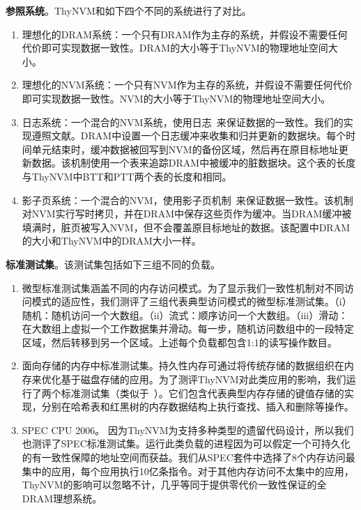 \textbf{参照系统}。ThyNVM和如下四个不同的系统进行了对比。
\begin{enumerate}
\item 理想化的DRAM系统：一个只有DRAM作为主存的系统，并假设不需要任何代价即可实现数据一致性。DRAM的大小等于ThyNVM的物理地址空间大小。 
\item 理想化的NVM系统：一个只有NVM作为主存的系统，并假设不需要任何代价即可实现数据一致性。NVM的大小等于ThyNVM的物理地址空间大小。 
\item 日志系统：一个混合的NVM系统，使用日志~\cite{DeWitt:1984:ITM:602259.602261, Hagmann:1987:RCF:41457.37518,
ext4}来保证数据的一致性。我们的实现遵照文献\cite{Remzi:Journaling}。DRAM中设置一个日志缓冲来收集和归并更新的数据块。每个时间单元结束时，缓冲数据被回写到NVM的备份区域，然后再在原目标地址更新数据。该机制使用一个表来追踪DRAM中被缓冲的脏数据块。这个表的长度与ThyNVM中BTT和PTT两个表的长度和相同。 
\item 影子页系统：一个混合的NVM，使用影子页机制~\cite{bernstein2009principles}来保证数据一致性。该机制对NVM实行写时拷贝，并在DRAM中保存这些页作为缓冲。当DRAM缓冲被填满时，脏页被写入NVM，但不会覆盖原目标地址的数据。该配置中DRAM的大小和ThyNVM中的DRAM大小一样。
\end{enumerate}
 
\textbf{标准测试集}。该测试集包括如下三组不同的负载。

\begin{enumerate}
\item 微型标准测试集涵盖不同的内存访问模式。为了显示我们一致性机制对不同访问模式的适应性，我们测评了三组代表典型访问模式的微型标准测试集。（i）随机：随机访问一个大数组。（ii）流式：顺序访问一个大数组。（iii）滑动：在大数组上虚拟一个工作数据集并滑动。每一步，随机访问数组中的一段特定区域，然后转移到另一个区域。上述每个负载都包含1:1的读写操作数目。
\item 面向存储的内存中标准测试集。持久性内存可通过将传统存储的数据组织在内存来优化基于磁盘存储的应用。为了测评ThyNVM对此类应用的影响，我们运行了两个标准测试集（类似于~\cite{Coburn:2011:NMP:1950365.1950380, Zhao:2013:KCP:2540708.2540744}）。它们包含代表典型内存存储的键值存储的实现，分别在哈希表和红黑树的内存数据结构上执行查找、插入和删除等操作。 
\item SPEC CPU 2006。 因为ThyNVM为支持多种类型的遗留代码设计，所以我们也测评了SPEC标准测试集。运行此类负载的进程因为可以假定一个可持久化的有一致性保障的地址空间而获益。我们从SPEC套件中选择了8个内存访问最集中的应用，每个应用执行10亿条指令。对于其他内存访问不太集中的应用，ThyNVM的影响可以忽略不计，几乎等同于提供零代价一致性保证的全DRAM理想系统。 
\end{enumerate}

